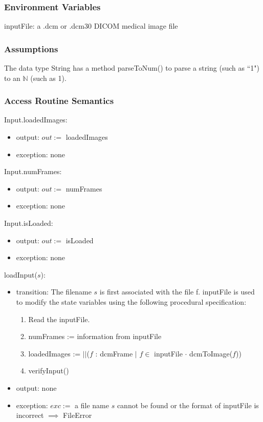 \documentclass[12pt, titlepage]{article}
\begin{document}
\subsubsection{Environment Variables}

inputFile: a .dcm or .dcm30 DICOM medical image file

\subsubsection{Assumptions}

The data type String has a method parseToNum() to parse a string (such as ``1")
to an $\mathbb{N}$ (such as 1).

\subsubsection{Access Routine Semantics}

\noindent Input.loadedImages:
\begin{itemize}
\item output: $out:=$ loadedImages 
\item exception: none 
\end{itemize}

\noindent Input.numFrames:
\begin{itemize}
\item output: $out:=$ numFrames 
\item exception: none 
\end{itemize}

\noindent Input.isLoaded:
\begin{itemize}
\item output: $out:=$ isLoaded 
\item exception: none 
\end{itemize}

\noindent loadInput($s$):
\begin{itemize}
\item transition: 
The filename $s$ is first associated with the file f. inputFile is used to
modify
the state variables using the following procedural specification:
\begin{enumerate}
    \item Read the inputFile.
    \item
    numFrames := information from inputFile
    \item
loadedImages := $||$($f$ : dcmFrame $|$ $f \in $ inputFile $\cdot$
dcmToImage($f$))
    \item
    verifyInput()
\end{enumerate}
\item output: none
\item exception: $exc :=$ a file name $s$ cannot be found or the format of
inputFile is incorrect
$\implies$ FileError
\end{itemize}
\end{document}
